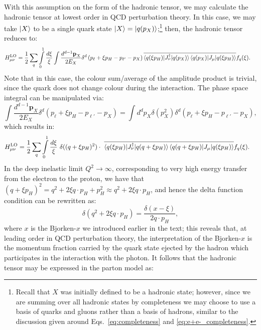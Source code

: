 \documentclass[withindex,glossary]{cam-thesis}
\renewcommand{\vec}[1]{\textbf{#1}} %
\begin{document}
With this assumption on the form of the hadronic tensor, we may calculate the hadronic tensor at lowest order in QCD perturbation theory. In this case, we may take $\ket{X}$ to be a single quark state $\ket{X} = \ket{q(p_X)}$;\footnote{Recall that $X$ was initially defined to be a hadronic state; however, since we are summing over all hadronic states by completeness we may choose to use a basis of quarks and gluons rather than a basis of hadrons, similar to the discussion given around Eqs.~\eqref{eq:completeness} and \eqref{eq:e+e-_completeness}.} then, the hadronic tensor reduces to:
\begin{align}
H_{\mu\nu}^{\text{LO}} &= \frac{1}{2} \sum_{q} \int\limits_{0}^{1} \frac{d\xi}{\xi} \int\frac{d^{d-1} \vec{p}_X}{ 2E_{X}} \delta^d\left(p_\ell + \xi p_H - p_{\ell'} - p_X\right)  \overline{\braket{q(\xi p_H) | J_{\nu}^{\dagger} | q(p_X)}\braket{q(p_X) | J_{\mu} | q(\xi p_H) }} f_q(\xi).
\end{align}
Note that in this case, the colour sum/average of the amplitude product is trivial, since the quark does not change colour during the interaction. The phase space integral can be manipulated via:
\begin{equation}
\int\frac{d^{d-1} \vec{p}_X}{ 2E_{X}} \delta^d\left(p_\ell + \xi p_H - p_{\ell'} - p_X\right) = \int d^d p_X \delta(p_X^2) \delta^d\left( p_{\ell} + \xi p_H - p_{\ell'} - p_X \right),
\end{equation}
which results in:
\begin{align}
H_{\mu\nu}^{\text{LO}} &= \frac{1}{2} \sum_{q}\int\limits_{0}^{1} \frac{d\xi}{\xi}\ \delta((q + \xi p_H)^2) \cdot \ \overline{\braket{q(\xi p_H) | J_{\nu}^{\dagger} | q(q + \xi p_H)}\braket{q(q + \xi p_H) | J_{\mu} | q(\xi p_H) }} f_q(\xi).
\end{align}
In the deep inelastic limit $Q^2 \rightarrow \infty$, corresponding to very high energy transfer from the electron to the proton, we have that $(q + \xi p_H)^2 = q^2 + 2 \xi q \cdot p_H + p_H^2 \approx q^2 + 2 \xi q \cdot p_H$, and hence the delta function condition can be rewritten as:
\begin{equation}
\delta(q^2 + 2 \xi q \cdot p_H) = \frac{\delta(x - \xi)}{2 q \cdot p_H},
\end{equation}
where $x$ is the Bjorken-$x$ we introduced earlier in the text; this reveals that, at leading order in QCD perturbation theory, the interpretation of the Bjorken-$x$ is the momentum fraction carried by the quark state ejected by the hadron which participates in the interaction with the photon. It follows that the hadronic tensor may be expressed in the parton model as:
\end{document}
